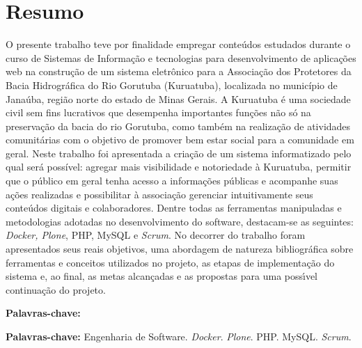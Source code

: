 \chapter*{Resumo}

\vspace{0.4cm}

\noindent O presente trabalho teve por finalidade empregar conteúdos estudados durante o curso de Sistemas de Informação e tecnologias para desenvolvimento de aplicações web na construção de um sistema eletrônico para a Associação dos Protetores da Bacia Hidrográfica do Rio Gorutuba (Kuruatuba), localizada no município de Janaúba, região norte do estado de Minas Gerais. 
A Kuruatuba é uma sociedade civil sem fins lucrativos que desempenha importantes funções não só na preservação da bacia do rio Gorutuba, como também na realização de atividades comunitárias com o objetivo de promover bem estar social para a comunidade em geral. 
Neste trabalho foi apresentada a criação de um sistema informatizado pelo qual será possível: agregar mais visibilidade e notoriedade à Kuruatuba, permitir que o público em geral tenha acesso a informações públicas e acompanhe suas ações realizadas e possibilitar à associação gerenciar intuitivamente seus conteúdos digitais e colaboradores.  
Dentre todas as ferramentas manipuladas e metodologias adotadas no desenvolvimento do software, destacam-se as seguintes: \textit{Docker, Plone}, PHP, MySQL e \textit{Scrum}.  
No decorrer do trabalho foram apresentados seus reais objetivos, uma abordagem de natureza bibliográfica sobre ferramentas e conceitos utilizados no projeto, as etapas de implementação do sistema e, ao final, as metas alcançadas e as propostas para uma possı́vel continuação do projeto.

\begin{labeling}{\textbf{Palavras-chave:}}
\item[\textbf{Palavras-chave:}] 
Engenharia de Software.
\textit{Docker}.
\textit{Plone}.
PHP.
MySQL.
\textit{Scrum}.
\end{labeling}


